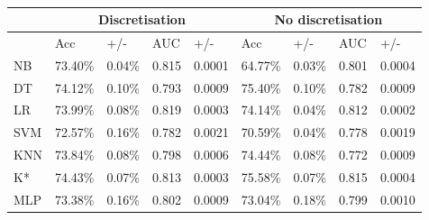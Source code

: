 \begin{table}[htbp]
\caption{}
\begin{tabular}{|l|r|r|r|r|r|r|r|r|}
\hline
 & \multicolumn{ 4}{c|}{Discretisation} & \multicolumn{ 4}{c|}{No discretisation} \\ \hline
 & \multicolumn{1}{l|}{Acc} & \multicolumn{1}{l|}{+/-} & \multicolumn{1}{l|}{AUC} & \multicolumn{1}{l|}{+/-} & \multicolumn{1}{l|}{Acc} & \multicolumn{1}{l|}{+/-} & \multicolumn{1}{l|}{AUC} & \multicolumn{1}{l|}{+/-} \\ \hline
NB & 73.40\% & 0.04\% & 0.815 & 0.0001 & 64.77\% & 0.03\% & 0.801 & 0.0004 \\ \hline
DT & 74.12\% & 0.10\% & 0.793 & 0.0009 & 75.40\% & 0.10\% & 0.782 & 0.0009 \\ \hline
LR & 73.99\% & 0.08\% & 0.819 & 0.0003 & 74.14\% & 0.04\% & 0.812 & 0.0002 \\ \hline
SVM & 72.57\% & 0.16\% & 0.782 & 0.0021 & 70.59\% & 0.04\% & 0.778 & 0.0019 \\ \hline
KNN & 73.84\% & 0.08\% & 0.798 & 0.0006 & 74.44\% & 0.08\% & 0.772 & 0.0009 \\ \hline
K* & 74.43\% & 0.07\% & 0.813 & 0.0003 & 75.58\% & 0.07\% & 0.815 & 0.0004 \\ \hline
MLP & 73.38\% & 0.16\% & 0.802 & 0.0009 & 73.04\% & 0.18\% & 0.799 & 0.0010 \\ \hline
\end{tabular}
\label{}
\end{table}
